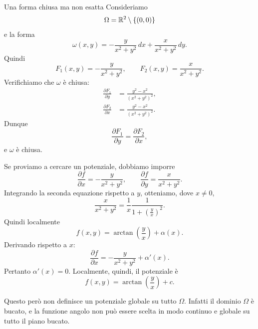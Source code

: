 \documentclass[a4paper]{article}
\begin{document}
\begin{snippetexample}{Una forma chiusa ma non esatta}
    Consideriamo
    \[
        \Omega=\mathbb{R}^2\setminus\{(0,0)\}
    \]
    e la forma
    \[
        \omega(x,y)=
        -\frac{y}{x^2+y^2}\,dx
        +
        \frac{x}{x^2+y^2}\,dy.
    \]
    Quindi
    \[
        F_1(x,y)=-\frac{y}{x^2+y^2},
        \qquad
        F_2(x,y)=\frac{x}{x^2+y^2}.
    \]
    Verifichiamo che \(\omega\) è chiusa:
    \begin{align*}
        \frac{\partial F_1}{\partial y}
        &=
        \frac{y^2-x^2}{(x^2+y^2)^2},\\
        \frac{\partial F_2}{\partial x}
        &=
        \frac{y^2-x^2}{(x^2+y^2)^2}.
    \end{align*}
    Dunque
    \[
        \frac{\partial F_1}{\partial y}
        =
        \frac{\partial F_2}{\partial x},
    \]
    e \(\omega\) è chiusa.

    Se proviamo a cercare un potenziale, dobbiamo imporre
    \[
        \frac{\partial f}{\partial x}
        =
        -\frac{y}{x^2+y^2},
        \qquad
        \frac{\partial f}{\partial y}
        =
        \frac{x}{x^2+y^2}.
    \]
    Integrando la seconda equazione rispetto a \(y\), otteniamo, dove \(x\neq 0\),
    \[
        \frac{x}{x^2+y^2}
        =
        \frac{1}{x}\frac{1}{1+\left(\frac{y}{x}\right)^2}.
    \]
    Quindi localmente
    \[
        f(x,y)=\arctan\left(\frac{y}{x}\right)+\alpha(x).
    \]
    Derivando rispetto a \(x\):
    \[
        \frac{\partial f}{\partial x}
        =
        -\frac{y}{x^2+y^2}+\alpha'(x).
    \]
    Pertanto \(\alpha'(x)=0\). Localmente, quindi, il potenziale è
    \[
        f(x,y)=\arctan\left(\frac{y}{x}\right)+c.
    \]

    Questo però non definisce un potenziale globale su tutto \(\Omega\). Infatti il dominio \(\Omega\) è bucato, e la funzione angolo non può essere scelta in modo continuo e globale su tutto il piano bucato.

    \begin{center}
    \end{center}


\end{snippetexample}
\end{document}
